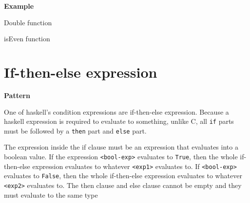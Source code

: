\begin{Shaded}
\begin{Highlighting}[]
\OtherTok{=} \OperatorTok{\textless{}}\OperatorTok{\textgreater{}}
\end{Highlighting}
\end{Shaded}

\textbf{Example}

Double function

\begin{Shaded}
\begin{Highlighting}[]
\OtherTok{=}\OperatorTok{+}
\end{Highlighting}
\end{Shaded}

isEven function

\begin{Shaded}
\begin{Highlighting}[]
\OtherTok{=}\OperatorTok{\%} 
\end{Highlighting}
\end{Shaded}

\section{If-then-else
expression}\label{haskell-cheat-sheet.md__if-then-else-expression}

\textbf{Pattern}

One of haskell's condition expressions are if-then-else expression.
Because a haskell expression is required to evaluate to something,
unlike C, all \texttt{if} parts must be followed by a \texttt{then} part
and \texttt{else} part.

\begin{Shaded}
\begin{Highlighting}[]
 \OperatorTok{\textless{}}\OperatorTok{{-}}\OperatorTok{\textgreater{}}  \OperatorTok{\textless{}}\OperatorTok{\textgreater{}}  \OperatorTok{\textless{}}\OperatorTok{\textgreater{}}
\end{Highlighting}
\end{Shaded}

The expression inside the if clause must be an expression that evaluates
into a boolean value. If the expression
\texttt{\textless{}bool-exp\textgreater{}} evaluates to \texttt{True},
then the whole if-then-else expression evaluates to whatever
\texttt{\textless{}exp1\textgreater{}} evaluates to. If
\texttt{\textless{}bool-exp\textgreater{}} evaluates to \texttt{False},
then the whole if-then-else expression evaluates to whatever
\texttt{\textless{}exp2\textgreater{}} evaluates to. The then clause and
else clause cannot be empty and they must evaluate to the same type


